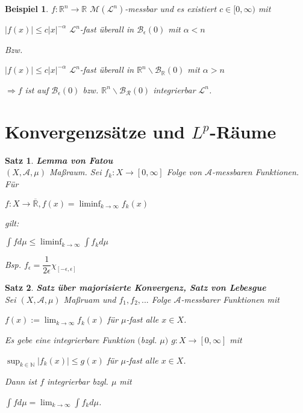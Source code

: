 \documentclass[11pt]{memoir}
\theoremstyle{changebreak}
\newtheorem{Beispiel}{Beispiel}[chapter]
\newtheorem{Satz}{Satz}[chapter]
\begin{document}
\begin{Beispiel}
$f: \mathbb R^n \rightarrow \mathbb R$ $\mathscr M(\mathscr L^n)$-messbar und es existiert $c \in [0, \infty)$ mit 
\begin{center}
	$|f(x)| \leq c|x|^{-\alpha}$ $\mathscr L^n$-fast überall in $\mathscr B_\epsilon (0)$ mit $\alpha < n$ 
\end{center}
Bzw. 
\begin{center}
	$|f(x)| \leq c|x|^{-\alpha}$ $\mathscr L^n$-fast überall in $\mathbb R^n \backslash \mathscr B_\mathbb R (0)$ mit $\alpha > n$ 
\end{center}
\begin{center}
	$\Rightarrow f$ ist auf $\mathscr B_\epsilon (0)$ bzw. $\mathbb R^n \backslash \mathscr B_\mathscr R (0)$ integrierbar $\mathscr L^n$.
\end{center} 
\end{Beispiel}


\section{Konvergenzsätze und $L^p$-Räume}

\begin{Satz}
\emph{\textbf{Lemma von Fatou}} \\
$(X, \mathscr A, \mu)$ Maßraum. Sei $f_k: X \rightarrow [0, \infty]$ Folge von $\mathscr A$-messbaren Funktionen. Für 
\begin{center}
	$f: X \rightarrow \overline{\mathbb R}, f(x) = \liminf_{k \rightarrow \infty} f_k (x)$
\end{center}
gilt: \\
\begin{center}
$\int f d\mu \leq \liminf_{k \rightarrow \infty} \int f_k d\mu$
\end{center}

Bsp. $f_\epsilon = \dfrac{1}{2\epsilon} \chi_{[-\epsilon, \epsilon]}$
\end{Satz}

\begin{Satz}
\emph{\textbf{Satz über majorisierte Konvergenz, Satz von Lebesgue}} \\
Sei $(X, \mathscr A, \mu)$ Maßruam und $f_1, f_2, ...$ Folge $\mathscr A$-messbarer Funktionen mit 
\begin{center}
	$f(x) := \lim_{k \rightarrow \infty} f_k (x)$ für $\mu$-fast alle $x \in X$. 
\end{center}
Es gebe eine integrierbare Funktion $($bzgl. $\mu)$ $g: X \rightarrow [0, \infty]$ mit 
\begin{center}
	$\sup_{k \in \mathbb N} |f_k (x)| \leq g(x)$ für $\mu$-fast alle $x \in X$. 
\end{center}
Dann ist $f$ integrierbar bzgl. $\mu$ mit
\begin{center}
$\int f d\mu = \lim_{k \rightarrow \infty} \int f_k d\mu$.
\end{center}
\end{Satz}
\end{document}
